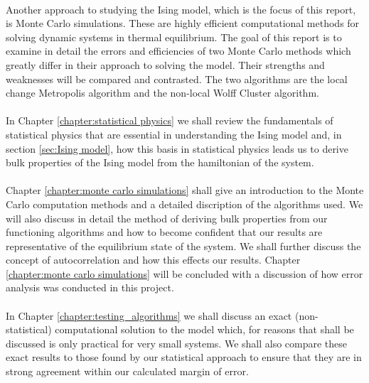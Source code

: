 \documentclass[12pt] {report} %
\begin{document}
		\paragraph{}
			Another approach to studying the Ising model, which is the focus of this report, is Monte Carlo simulations. These are highly efficient computational methods for solving dynamic systems in thermal equilibrium. The goal of this report is to examine in detail the errors and efficiencies of two Monte Carlo methods which greatly differ in their approach to solving the model. Their strengths and weaknesses will be compared and contrasted. The two algorithms are the local change Metropolis algorithm and the non-local Wolff Cluster algorithm.
		\paragraph{}
			In Chapter \ref{chapter:statistical physics} we shall review the fundamentals of statistical physics that are essential in understanding the Ising model and, in section \ref{sec:Ising model}, how this basis in statistical physics leads us to derive bulk properties of the Ising model from the hamiltonian of the system.
		\paragraph{}
			 Chapter \ref{chapter:monte carlo simulations} shall give an introduction to the Monte Carlo computation methods and a detailed discription of the algorithms used. We will also discuss in detail the method of deriving bulk properties from our functioning algorithms and how to become confident that our results are representative of the equilibrium state of the system. We shall further discuss the concept of autocorrelation and how this effects our results. Chapter \ref{chapter:monte carlo simulations} will be concluded with a discussion of how error analysis was conducted in this project.
		\paragraph{}
			In Chapter \ref{chapter:testing_algorithms} we shall discuss an exact (non-statistical) computational solution to the model which, for reasons that shall be discussed is only practical for very small systems. We shall also compare these exact results to those found by our statistical approach to ensure that they are in strong agreement within our calculated margin of error.
\end{document}
